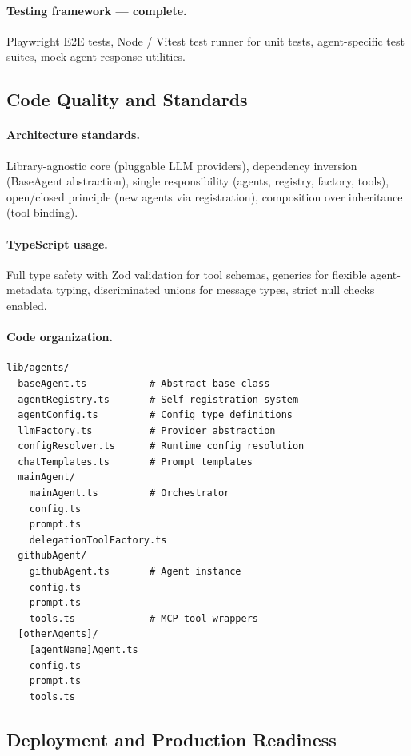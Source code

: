 \documentclass[11pt,a4paper]{report}
\begin{document}
\paragraph{Testing framework --- complete.}
Playwright E2E tests, Node / Vitest test runner for unit tests, agent-specific
test suites, mock agent-response utilities.

\subsection{Code Quality and Standards}

\paragraph{Architecture standards.}
Library-agnostic core (pluggable LLM providers), dependency inversion
(BaseAgent abstraction), single responsibility (agents, registry, factory,
tools), open/closed principle (new agents via registration), composition over
inheritance (tool binding).

\paragraph{TypeScript usage.}
Full type safety with Zod validation for tool schemas, generics for flexible
agent-metadata typing, discriminated unions for message types, strict null
checks enabled.

\paragraph{Code organization.}
\begin{lstlisting}[style=shstyle]
lib/agents/
  baseAgent.ts           # Abstract base class
  agentRegistry.ts       # Self-registration system
  agentConfig.ts         # Config type definitions
  llmFactory.ts          # Provider abstraction
  configResolver.ts      # Runtime config resolution
  chatTemplates.ts       # Prompt templates
  mainAgent/
    mainAgent.ts         # Orchestrator
    config.ts
    prompt.ts
    delegationToolFactory.ts
  githubAgent/
    githubAgent.ts       # Agent instance
    config.ts
    prompt.ts
    tools.ts             # MCP tool wrappers
  [otherAgents]/
    [agentName]Agent.ts
    config.ts
    prompt.ts
    tools.ts
\end{lstlisting}

\subsection{Deployment and Production Readiness}
\end{document}
